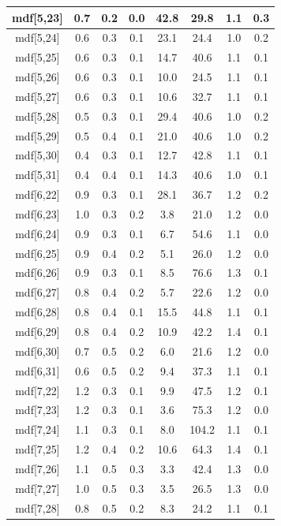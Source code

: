 \begin{longtable}{|c|c|c|c|c|c|c|c|}
\hline
mdf[5,23] & 0.7 & 0.2 & 0.0 & 42.8 & 29.8 & 1.1 & 0.3 \\
\hline
mdf[5,24] & 0.6 & 0.3 & 0.1 & 23.1 & 24.4 & 1.0 & 0.2 \\
\hline
mdf[5,25] & 0.6 & 0.3 & 0.1 & 14.7 & 40.6 & 1.1 & 0.1 \\
\hline
mdf[5,26] & 0.6 & 0.3 & 0.1 & 10.0 & 24.5 & 1.1 & 0.1 \\
\hline
mdf[5,27] & 0.6 & 0.3 & 0.1 & 10.6 & 32.7 & 1.1 & 0.1 \\
\hline
mdf[5,28] & 0.5 & 0.3 & 0.1 & 29.4 & 40.6 & 1.0 & 0.2 \\
\hline
mdf[5,29] & 0.5 & 0.4 & 0.1 & 21.0 & 40.6 & 1.0 & 0.2 \\
\hline
mdf[5,30] & 0.4 & 0.3 & 0.1 & 12.7 & 42.8 & 1.1 & 0.1 \\
\hline
mdf[5,31] & 0.4 & 0.4 & 0.1 & 14.3 & 40.6 & 1.0 & 0.1 \\
\hline
mdf[6,22] & 0.9 & 0.3 & 0.1 & 28.1 & 36.7 & 1.2 & 0.2 \\
\hline
mdf[6,23] & 1.0 & 0.3 & 0.2 & 3.8 & 21.0 & 1.2 & 0.0 \\
\hline
mdf[6,24] & 0.9 & 0.3 & 0.1 & 6.7 & 54.6 & 1.1 & 0.0 \\
\hline
mdf[6,25] & 0.9 & 0.4 & 0.2 & 5.1 & 26.0 & 1.2 & 0.0 \\
\hline
mdf[6,26] & 0.9 & 0.3 & 0.1 & 8.5 & 76.6 & 1.3 & 0.1 \\
\hline
mdf[6,27] & 0.8 & 0.4 & 0.2 & 5.7 & 22.6 & 1.2 & 0.0 \\
\hline
mdf[6,28] & 0.8 & 0.4 & 0.1 & 15.5 & 44.8 & 1.1 & 0.1 \\
\hline
mdf[6,29] & 0.8 & 0.4 & 0.2 & 10.9 & 42.2 & 1.4 & 0.1 \\
\hline
mdf[6,30] & 0.7 & 0.5 & 0.2 & 6.0 & 21.6 & 1.2 & 0.0 \\
\hline
mdf[6,31] & 0.6 & 0.5 & 0.2 & 9.4 & 37.3 & 1.1 & 0.1 \\
\hline
mdf[7,22] & 1.2 & 0.3 & 0.1 & 9.9 & 47.5 & 1.2 & 0.1 \\
\hline
mdf[7,23] & 1.2 & 0.3 & 0.1 & 3.6 & 75.3 & 1.2 & 0.0 \\
\hline
mdf[7,24] & 1.1 & 0.3 & 0.1 & 8.0 & 104.2 & 1.1 & 0.1 \\
\hline
mdf[7,25] & 1.2 & 0.4 & 0.2 & 10.6 & 64.3 & 1.4 & 0.1 \\
\hline
mdf[7,26] & 1.1 & 0.5 & 0.3 & 3.3 & 42.4 & 1.3 & 0.0 \\
\hline
mdf[7,27] & 1.0 & 0.5 & 0.3 & 3.5 & 26.5 & 1.3 & 0.0 \\
\hline
mdf[7,28] & 0.8 & 0.5 & 0.2 & 8.3 & 24.2 & 1.1 & 0.1 \\

\end{longtable}
